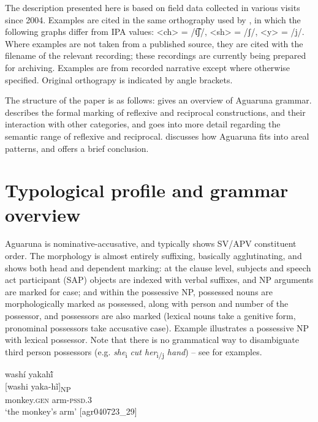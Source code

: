 \documentclass[output=paper]{langscibook}
\begin{document}
The description presented here is based on field data collected in various visits since 2004. Examples are cited in the same orthography used by \citet{Overall2017}, in which the following graphs differ from IPA values: <ch> = /t͡ʃ/, <sh> = /ʃ/, <y> = /j/. Where examples are not taken from a published source, they are cited with the filename of the relevant recording; these recordings are currently being prepared for archiving. Examples are from recorded narrative except where otherwise specified. Original orthograpy is indicated by angle brackets.

The structure of the paper is as follows:  gives an overview of Aguaruna grammar.  describes the formal marking of
reflexive and reciprocal constructions, and their interaction with other categories, and  goes into more detail regarding the semantic range of reflexive and reciprocal.  discusses how Aguaruna fits into areal patterns, and  offers a brief conclusion.

\section{Typological profile and grammar overview} %
\label{sec:overall:2}

Aguaruna is nominative-accusative, and typically shows SV/APV constituent order. The morphology is almost entirely suffixing, basically agglutinating, and shows both head and dependent marking: at the clause level, subjects and speech act participant (SAP) objects are indexed with verbal suffixes, and NP arguments are marked for case; and within the possessive NP, possessed nouns are morphologically marked as possessed, along with person and number of the possessor, and possessors are also marked (lexical nouns take a genitive form, pronominal possessors take accusative case). Example  illustrates a possessive NP with lexical possessor. Note that there is no grammatical way to disambiguate third person possessors (e.g. \textit{she}\textsubscript{i} \textit{cut her}\textsubscript{i/j} \textit{hand}) – see  for examples.

\ea%
    \label{ex:overall:1}
 \glll washí yakah\'ĩ\\
    {}[washi  yaka-hĩ]\textsubscript{NP}\\
  monkey.\textsc{gen}  arm-\textsc{pssd.3}\\
  \glt  ‘the monkey’s arm’ [agr040723\_29]
\z
\end{document}
